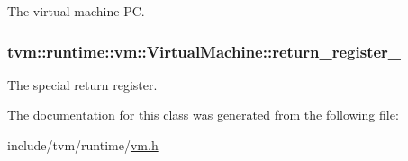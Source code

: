 The virtual machine PC. 

\subsubsection[{\texorpdfstring{return\+\_\+register\+\_\+}{return_register_}}]{ tvm\+::runtime\+::vm\+::\+Virtual\+Machine\+::return\+\_\+register\+\_\+\hspace{0.3cm}{\ttfamily [protected]}}\hypertarget{classtvm_1_1runtime_1_1vm_1_1VirtualMachine_afd0505002da7e7f86f82b2f3325ff127}{}\label{classtvm_1_1runtime_1_1vm_1_1VirtualMachine_afd0505002da7e7f86f82b2f3325ff127}


The special return register. 



The documentation for this class was generated from the following file\+:\begin{DoxyCompactItemize}
\item 
include/tvm/runtime/\hyperlink{vm_8h}{vm.\+h}\end{DoxyCompactItemize}
